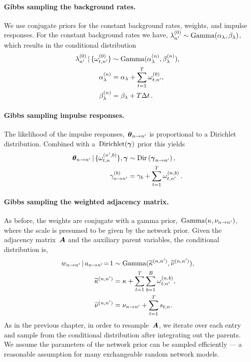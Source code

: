 \paragraph{Gibbs sampling the background rates.}
We use conjugate priors for the constant background rates, weights,
and impulse responses.  For the constant background rates we have,
${\lambda_{n'}^{(0)} \sim\mathrm{Gamma}(\alpha_\lambda, \beta_\lambda)}$,
which results in the conditional distribution
\begin{align*}
\lambda_{n'}^{(0)} \,|\, \{\omega_{t,n'}^{(0)}\} &\sim
\mathrm{Gamma}(\alpha_\lambda^{(n)}, \beta_\lambda^{(n)}), \\
\alpha_\lambda^{(n)} &= \alpha_\lambda + \sum_{t=1}^T \omega_{t,n'}^{(0)}, \\
\beta_\lambda^{(n)} &= \beta_\lambda + T \Delta t\,.
\end{align*}

\paragraph{Gibbs sampling impulse responses.}
The likelihood of the impulse responses,~$\boldsymbol{\theta}_{n \to n'}$ is
proportional to a Dirichlet distribution.  Combined with
a~$\text{Dirichlet}(\boldsymbol{\gamma})$ prior this yields
\begin{align*}
  \boldsymbol{\theta}_{n \to n'} \,|\, \{\omega_{t,n}^{(n',b)}\}, \boldsymbol{\gamma}
  &\sim \mathrm{Dir}\left( \boldsymbol{\gamma}_{n \to n'} \right), \\
  \gamma_{n \to n'}^{(b)} &=  \gamma_b + \sum_{t=1}^T \omega_{t,n'}^{(n, b)}\,.
\end{align*}

\paragraph{Gibbs sampling the weighted adjacency matrix.}
As before, the weights are conjugate with a gamma
prior,~$\mathrm{Gamma}(\kappa, \nu_{n \to n'})$, where the scale is presumed to
be given by the network prior.  Given the adjacency matrix~$\boldsymbol{A}$
and the auxiliary parent variables, the conditional distribution is,
\begin{align*}
  w_{n \to n'} \,|\, a_{n \to n'}\!=\!1
  &\sim \mathrm{Gamma}(\widetilde{\kappa}^{(n,n')}, \widetilde{\nu}^{(n,n')}), \\
  \widetilde{\kappa}^{(n,n')} &= \kappa + \sum_{t=1}^T \sum_{b=1}^B \omega_{t,n'}^{(n,b)}, \\
  \widetilde{\nu}^{(n,n')} &= \nu_{n \to n'} +  \sum_{t=1}^T s_{t,n}.
\end{align*}
As in the previous chapter, in order to resample~$\boldsymbol{A}$, we iterate over
each entry and sample from the conditional distribution after integrating
out the parents. We assume the parameters of the network prior can be
sampled efficiently --- a reasonable assumption for many exchangeable random network
models.

